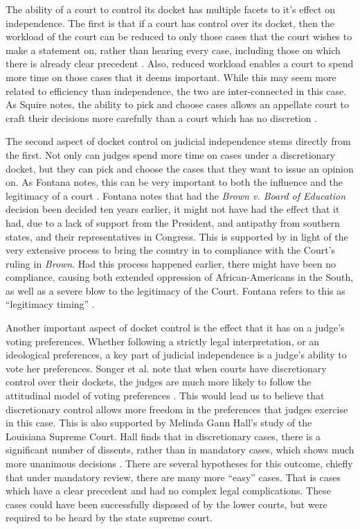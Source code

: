 \documentclass[12pt]{article}
\begin{document}
The ability of a court to control its docket has multiple facets to it's effect on independence.  The first is that if a court has control over its docket, then the workload of the court can be reduced to only those cases that the court wishes to make a statement on, rather than hearing every case, including those on which there is already clear precedent \citep{Maltzman2000}.  Also, reduced workload enables a court to spend more time on those cases that it deems important.  While this may seem more related to efficiency than independence, the two are inter-connected in this case.  As Squire notes, the ability to pick and choose cases allows an appellate court to craft their decisions more carefully than a court which has no discretion \citep{Squire2008}.

The second aspect of docket control on judicial independence stems directly from the first.  Not only can judges spend more time on cases under a discretionary docket, but they can pick and choose the cases that they want to issue an opinion on.  As Fontana notes, this can be very important to both the influence and the legitimacy of a court \citep{Fontana2011}.  Fontana notes that had the \textit{Brown v. Board of Education} decision been decided ten years earlier, it might not have had the effect that it had, due to a lack of support from the President, and antipathy from southern states, and their representatives in Congress.  This is supported by \citet{Rosenberg1991} in light of the very extensive process to bring the country in to compliance with the Court's ruling in \textit{Brown}.  Had this process happened earlier, there might have been no compliance, causing both extended oppression of African-Americans in the South, as well as a severe blow to the legitimacy of the Court.  Fontana refers to this as ``legitimacy timing'' \citep[627]{Fontana2011}.  

Another important aspect of docket control is the effect that it has on a judge's voting preferences.  Whether following a strictly legal interpretation, or an ideological preferences, a key part of judicial independence is a judge's ability to vote her preferences.  Songer et al. note that when courts have discretionary control over their dockets, the judges are much more likely to follow the attitudinal model of voting preferences \citep{Songer2003}.  This would lead us to believe that discretionary control allows more freedom in the preferences that judges exercise in this case.   This is also supported by Melinda Gann Hall's study of the Louisiana Supreme Court.  Hall finds that in discretionary cases, there is a significant number of dissents, rather than in mandatory cases, which shows much more unanimous decisions \citep{Hall1985}.  There are several hypotheses for this outcome, chiefly that under mandatory review, there are many more ``easy'' cases.  That is cases which have a clear precedent and had no complex legal complications.  These cases could have been successfully disposed of by the lower courts, but were required to be heard by the state supreme court.   
\end{document}
